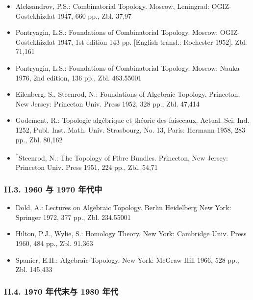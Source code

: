 \begin{itemize}
\item Aleksandrov, P.S.: Combinatorial Topology. Moscow, Leningrad: OGIZ-Gostekhizdat 1947, 660 pp., Zbl. 37,97
\item Pontryagin, L.S.: Foundations of Combinatorial Topology. Moscow: OGIZ-Gostekhizdat 1947, 1st edition 143 pp. [English transl.: Rochester 1952]. Zbl. 71,161
\item Pontryagin, L.S.: Foundations of Combinatorial Topology. Moscow: Nauka 1976, 2nd edition, 136 pp., Zbl. 463.55001
\item Eilenberg, S., Steenrod, N.: Foundations of Algebraic Topology. Princeton, New Jersey: Princeton Univ. Press 1952, 328 pp., Zbl. 47,414
\item Godement, R.: Topologie algébrique et théorie des faisceaux. Actual. Sci. Ind. 1252, Publ. Inst. Math. Univ. Strasbourg, No. 13, Paris: Hermann 1958, 283 pp., Zbl. 80,162
\item \textsuperscript{*}Steenrod, N.: The Topology of Fibre Bundles. Princeton, New Jersey: Princeton Univ. Press 1951, 224 pp., Zbl. 54,71
\end{itemize}

\subsubsection*{II.3. 1960 与 1970 年代中}

\begin{itemize}
\item Dold, A.: Lectures on Algebraic Topology. Berlin Heidelberg New York: Springer 1972, 377 pp., Zbl. 234.55001
\item Hilton, P.J., Wylie, S.: Homology Theory. New York: Cambridge Univ. Press 1960, 484 pp., Zbl. 91,363
\item Spanier, E.H.: Algebraic Topology. New York: McGraw Hill 1966, 528 pp., Zbl. 145,433
\end{itemize}

\subsubsection*{II.4. 1970 年代末与 1980 年代}

